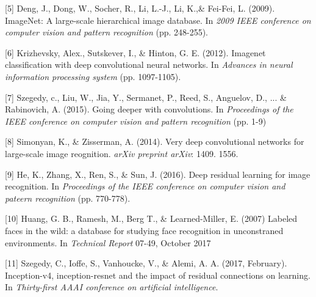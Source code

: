 \documentclass{article}
\begin{document}
[5] Deng, J., Dong, W., Socher, R., Li, L.-J., Li, K.,\& Fei-Fei, L. (2009).
ImageNet: A large-scale hierarchical image database. In {\it 2009 IEEE
conference on computer vision and pattern recognition} (pp. 248-255).

[6] Krizhevsky, Alex., Sutskever, I., \& Hinton, G. E. (2012). Imagenet
classification with deep convolutional neural networks. In {\it Advances in
neural information processing system} (pp. 1097-1105).

[7] Szegedy, c., Liu, W., Jia, Y., Sermanet, P., Reed, S., Anguelov, D., ... \& Rabinovich, A. (2015). Going deeper with convolutions. In {\it Proceedings of the IEEE conference on computer vision and pattern recognition} (pp. 1-9)

[8] Simonyan, K., \& Zisserman, A. (2014). Very deep convolutional networks for large-scale image reognition. {\it arXiv preprint arXiv}: 1409. 1556.

[9] He, K., Zhang, X., Ren, S., \& Sun, J. (2016). Deep residual learning for image recognition. In {\it Proceedings of the IEEE conference on computer vision and pateern recognition} (pp. 770-778).

[10] Huang, G. B., Ramesh, M., Berg T., \& Learned-Miller, E. (2007) Labeled faces in the wild: a database for studying face recognition in unconstraned environments. In {\it Technical Report} 07-49, October 2017

[11] Szegedy, C., Ioffe, S., Vanhoucke, V., \& Alemi, A. A. (2017, February). Inception-v4, inception-resnet and the impact of residual connections on learning. In {\it Thirty-first AAAI conference on artificial intelligence}.
\end{document}
